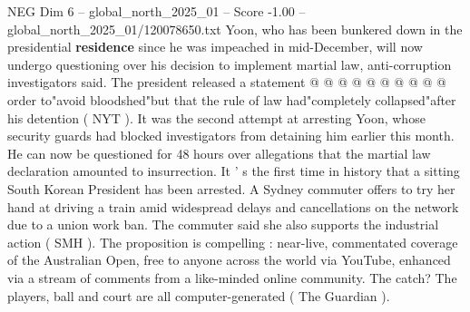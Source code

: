 \begin{textsample}{NEG Dim 6 – global\_north\_2025\_01 – Score -1.00 – global\_north\_2025\_01/120078650.txt}
Yoon, who has been bunkered down in the presidential \textbf{residence} since he was impeached in mid-December, will now undergo questioning over his decision to implement martial law, anti-corruption investigators said.
The president released a statement @ @ @ @ @ @ @ @ @ @ order to"avoid bloodshed"but that the rule of law had"completely collapsed"after his detention ( NYT ).
It was the second attempt at arresting Yoon, whose security guards had blocked investigators from detaining him earlier this month.
He can now be questioned for 48 hours over allegations that the martial law declaration amounted to insurrection.
It ' s the first time in history that a sitting South Korean President has been arrested.
A Sydney commuter offers to try her hand at driving a train amid widespread delays and cancellations on the network due to a union work ban.
The commuter said she also supports the industrial action ( SMH ).
The proposition is compelling : near-live, commentated coverage of the Australian Open, free to anyone across the world via YouTube, enhanced via a stream of comments from a like-minded online community.
The catch?
The players, ball and court are all computer-generated ( The Guardian ).

\end{textsample}
